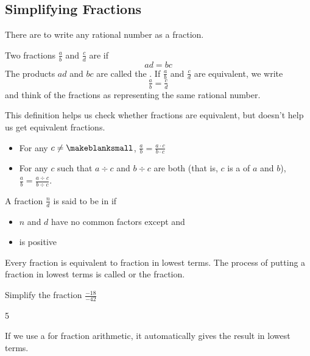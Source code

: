 \subsection{Simplifying Fractions}
There are \makeblank to write any rational number as a fraction.
\begin{definition}
Two fractions $\frac{a}{b}$ and $\frac{c}{d}$ are  if
$$
ad=bc
$$
The products $ad$ and $bc$ are called the . If $\frac{a}{b}$ and $\frac{c}{d}$ are equivalent, we write
$$
\tfrac{a}{b}=\tfrac{c}{d}
$$
and think of the fractions as representing the same rational number.
\end{definition}
This definition helps us check whether fractions are equivalent, but doesn't help us get equivalent fractions.
\begin{itemize}
\item For any \makeblank[1in] $c\neq\makeblanksmall$, $\frac{a}{b}=\frac{a\cdot c}{b\cdot c}$
\item For any \makeblank[1in] $c$ such that $a\div c$ and $b\div c$ are both \makeblank[1in] (that is, $c$ is a \makeblank of $a$ and $b$), $\frac{a}{b}=\frac{a\div c}{b\div c}$.
\end{itemize}
\begin{definition}
A fraction $\frac{n}{d}$ is said to be in  if
\begin{itemize}
\item $n$ and $d$ have no common factors except \makeblanksmall and \makeblanksmall
\item \makeblanksmall is positive
\end{itemize}
Every fraction is equivalent to \makeblank fraction in lowest terms. The process of putting a fraction in lowest terms is called  or  the fraction.
\end{definition}
\begin{Example}
Simplify the fraction $\frac{-18}{-42}$
\begin{cpic}{}{5}
\end{cpic}
\end{Example}
If we use a \makeblank for fraction arithmetic, it automatically gives the result in lowest terms.